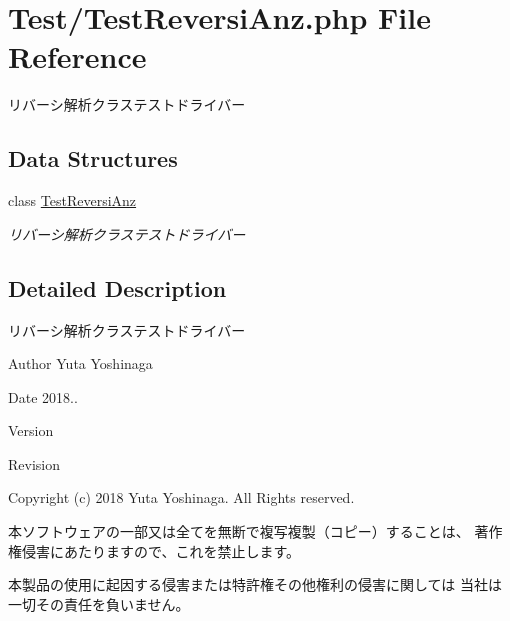 \hypertarget{_test_reversi_anz_8php}{}\section{Test/\+Test\+Reversi\+Anz.php File Reference}
\label{_test_reversi_anz_8php}


リバーシ解析クラステストドライバー  


\subsection*{Data Structures}
\begin{DoxyCompactItemize}
\item 
class \hyperlink{class_test_reversi_anz}{Test\+Reversi\+Anz}
\begin{DoxyCompactList}\small\item\em リバーシ解析クラステストドライバー \end{DoxyCompactList}\end{DoxyCompactItemize}


\subsection{Detailed Description}
リバーシ解析クラステストドライバー 

\begin{DoxyAuthor}{Author}
Yuta Yoshinaga 
\end{DoxyAuthor}
\begin{DoxyDate}{Date}
2018.. 
\end{DoxyDate}
\begin{DoxyParagraph}{Version}

\end{DoxyParagraph}
\begin{DoxyParagraph}{Revision}

\end{DoxyParagraph}


Copyright (c) 2018 Yuta Yoshinaga. All Rights reserved.


\begin{DoxyItemize}
\item 本ソフトウェアの一部又は全てを無断で複写複製（コピー）することは、 著作権侵害にあたりますので、これを禁止します。
\item 本製品の使用に起因する侵害または特許権その他権利の侵害に関しては 当社は一切その責任を負いません。 
\end{DoxyItemize}